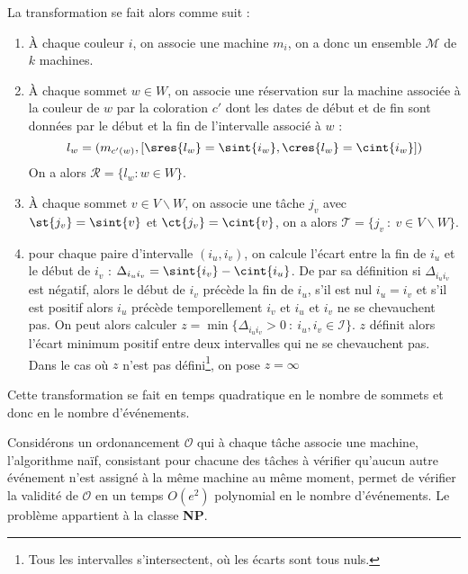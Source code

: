 \documentclass[a4paper,9pt]{report}
\begin{document}
La transformation se fait alors comme suit : 
\begin{enumerate}
    \item À chaque couleur $i$, on associe une machine $m_i$, on a donc un ensemble
        $\mathcal{M}$ de $k$ machines.
    \item À chaque sommet $w \in W$, on associe une réservation sur la machine associée à la
        couleur de $w$ par la coloration $c'$ dont les dates de début et de fin sont données par
        le début et la fin de l'intervalle associé à $w$ : \[
            l_w = (m_{c'(w)}, [\sres{l_w} = \sint{i_w}, \cres{l_w} = \cint{i_w}])
        \]
        On a alors $\mathcal{R} = \{l_w : w \in W\}$.
    \item À chaque sommet $v \in V \backslash W$, on associe une tâche $j_v$ avec $\st{j_v} =
        \sint{v}$ et $\ct{j_v} = \cint{v}$, on a alors $\mathcal{T} = \{j_v\ \colon\ v \in V
        \backslash W\}$.
    \item pour chaque paire d'intervalle $(i_u, i_v)$, on calcule l'écart entre la fin de $i_u$ et
        le début de $i_v$ : $\Delta_{i_ui_v} = \sint{i_v} - \cint{i_u}$. De par sa définition si
        $\Delta_{i_ui_v}$ est négatif, alors le début de $i_v$ précède la fin de $i_u$, s'il est nul
        $i_u = i_v$ et s'il est positif alors $i_u$ précède temporellement $i_v$ et $i_u$ et $i_v$
        ne se chevauchent pas. On peut alors calculer $z = \min\{\Delta_{i_ui_v} > 0\ :\ i_u, i_v
        \in \mathcal{I}\}$. $z$ définit alors l'écart minimum positif entre deux intervalles qui ne
        se chevauchent pas.
        Dans le cas où $z$ n'est pas
        défini\footnote{Tous les intervalles s'intersectent, où les écarts sont tous nuls.}, on
        pose $z = \infty$
\end{enumerate}

Cette transformation se fait en temps quadratique en le nombre de sommets et donc en le nombre
d'événements.

Considérons un ordonancement $\mathcal{O}$ qui à chaque tâche associe une machine, l'algorithme
naïf, consistant pour chacune des tâches à vérifier qu'aucun autre événement n'est assigné à la
même machine au même moment, permet de vérifier la validité de $\mathcal{O}$ en un temps
$O(e^2)$ polynomial en le nombre d'événements. Le problème \fischedpi appartient à la classe
\textbf{NP}.
\end{document}
